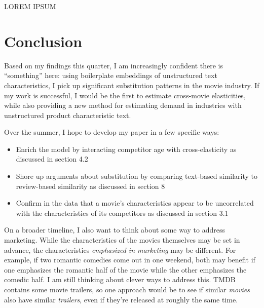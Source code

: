 \documentclass{article}
\begin{document}
LOREM IPSUM


\section{Conclusion}

Based on my findings this quarter, I am increasingly confident there is ``something'' here: using boilerplate embeddings of unstructured text characteristics, I pick up significant substitution patterns in the movie industry. If my work is successful, I would be the first to estimate cross-movie elasticities, while also providing a new method for estimating demand in industries with unstructured product characteristic text.

Over the summer, I hope to develop my paper in a few specific ways:
\begin{itemize}
    \item Enrich the model by interacting competitor age with cross-elasticity as discussed in section 4.2
    \item Shore up arguments about substitution by comparing text-based similarity to review-based similarity as discussed in section 8
    \item Confirm in the data that a movie's characteristics appear to be uncorrelated with the characteristics of its competitors as discussed in section 3.1
\end{itemize}

On a broader timeline, I also want to think about some way to address marketing. While the characteristics of the movies themselves may be set in advance, the characteristics \emph{emphasized in marketing} may be different. For example, if two romantic comedies come out in one weekend, both may benefit if one emphasizes the romantic half of the movie while the other emphasizes the comedic half. I am still thinking about clever ways to address this. TMDB contains some movie trailers, so one approach would be to see if similar \emph{movies} also have similar \emph{trailers}, even if they're released at roughly the same time. 

\printbibliography
\end{document}

